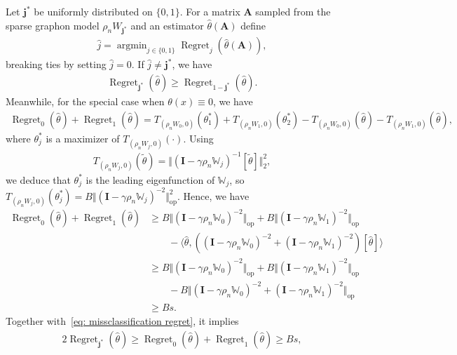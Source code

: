 \documentclass[11pt]{article}
\newcommand{\op}{\mathrm{op}}
\newcommand{\bA}{\bm{A}}
\newcommand{\bI}{\bm{I}}
\newcommand{\bbW}{\mathbb{W}}
\newcommand{\<}{\langle}
\renewcommand{\>}{\rangle}
\newcommand{\regret}{\operatorname{Regret}}
\newcommand{\bj}{\mathbf{j}}
\DeclareMathOperator*{\argmin}{argmin}
\theoremstyle{plain}
\theoremstyle{definition}
\theoremstyle{remark}
\begin{document}
{Let $\bj^*$ be uniformly distributed on $\{0, 1\}$. For a matrix $\bA$ sampled from the sparse graphon model $\rho_n W_{\bj^*}$ and an estimator $\widehat{\theta}(\bA)$ define
\begin{align*}
    \widehat{j} = \argmin_{j \in \{0, 1\}} \regret_j (\widehat{\theta}(\bA)),
\end{align*}
breaking ties by setting $\widehat{j} = 0$.
If $\widehat{j} \neq \bj^*$, we have
\begin{align}
\label{eq: missclassification regret}
    \regret_{\bj^*}(\widehat{\theta}) \ge \regret_{1 - \bj^*}(\widehat{\theta}).
\end{align}
Meanwhile, for the special case when $\theta(x) \equiv 0$, we have
\begin{align*}
    \regret_0(\widehat{\theta}) + \regret_1(\widehat{\theta}) = T_{(\rho_n W_0, 0)}(\theta^*_1) + T_{(\rho_n W_1, 0)}(\theta^*_2) - T_{(\rho_n W_0, 0)}(\widehat{\theta}) - T_{(\rho_n W_1, 0)}(\widehat{\theta}),
\end{align*}
where $\theta^*_j$ is a maximizer of $T_{(\rho_n W_j, 0)}(\cdot)$. Using
\begin{align*}
    T_{(\rho_n W_j, 0)}(\tilde{\theta}) = \Vert (\bI - \gamma \rho_n \bbW_j)^{-1} [\tilde{\theta}] \Vert_{2}^2,
\end{align*}
we deduce that $\theta^*_j$ is the leading eigenfunction of $\bbW_j$, so $T_{(\rho_n W_j, 0)}(\theta^*_j) = B \Vert (\bI - \gamma \rho_n \bbW_j)^{-2} \Vert_{\op}^2$. Hence, we have
\begin{align*}
    \regret_0(\widehat{\theta}) + \regret_1(\widehat{\theta}) & \ge B \Vert (\bI - \gamma \rho_n \bbW_0)^{-2} \Vert_{\op} + B \Vert (\bI - \gamma \rho_n \bbW_1)^{-2} \Vert_{\op} \\
    & \qquad - \langle \widehat{\theta}, \left ( (\bI - \gamma \rho_n \bbW_0)^{-2} + (\bI - \gamma \rho_n \bbW_1)^{-2} \right ) [\widehat{\theta}] \rangle \\
    & \ge B \Vert (\bI - \gamma \rho_n \bbW_0)^{-2} \Vert_{\op} + B \Vert (\bI - \gamma \rho_n \bbW_1)^{-2} \Vert_{\op} \\
    & \qquad - B \Vert (\bI - \gamma \rho_n \bbW_0)^{-2} + (\bI - \gamma \rho_n \bbW_1)^{-2}  \Vert_{\op} \\
    & \ge B s.
\end{align*}
Together with~\eqref{eq: missclassification regret}, it implies
\begin{align*}
    2 \regret_{\bj^*}(\widehat{\theta}) \ge \regret_0(\widehat{\theta}) + \regret_1(\widehat{\theta}) \ge B s,

\end{align*}}
\end{document}
